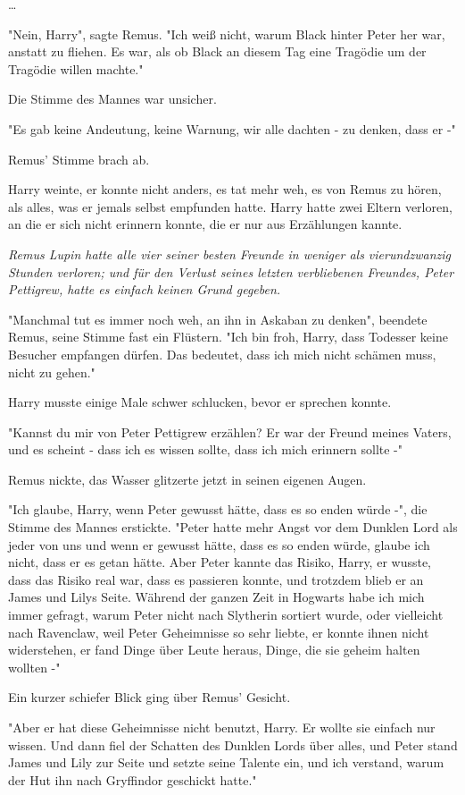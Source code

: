 {…

"Nein, Harry", sagte Remus. "Ich weiß nicht, warum Black hinter Peter her war, anstatt zu fliehen. Es war, als ob Black an diesem Tag eine Tragödie um der Tragödie willen machte."

Die Stimme des Mannes war unsicher.

"Es gab keine Andeutung, keine Warnung, wir alle dachten - zu denken, dass er -"

Remus' Stimme brach ab.

Harry weinte, er konnte nicht anders, es tat mehr weh, es von Remus zu hören, als alles, was er jemals selbst empfunden hatte. Harry hatte zwei Eltern verloren, an die er sich nicht erinnern konnte, die er nur aus Erzählungen kannte.

\emph{Remus Lupin hatte alle vier seiner besten Freunde in weniger als vierundzwanzig Stunden verloren; und für den Verlust seines letzten verbliebenen Freundes, Peter Pettigrew, hatte es einfach keinen Grund gegeben.}

"Manchmal tut es immer noch weh, an ihn in Askaban zu denken", beendete Remus, seine Stimme fast ein Flüstern. "Ich bin froh, Harry, dass Todesser keine Besucher empfangen dürfen. Das bedeutet, dass ich mich nicht schämen muss, nicht zu gehen."

Harry musste einige Male schwer schlucken, bevor er sprechen konnte.

"Kannst du mir von Peter Pettigrew erzählen? Er war der Freund meines Vaters, und es scheint - dass ich es wissen sollte, dass ich mich erinnern sollte -"

Remus nickte, das Wasser glitzerte jetzt in seinen eigenen Augen.

"Ich glaube, Harry, wenn Peter gewusst hätte, dass es so enden würde -", die Stimme des Mannes erstickte. "Peter hatte mehr Angst vor dem Dunklen Lord als jeder von uns und wenn er gewusst hätte, dass es so enden würde, glaube ich nicht, dass er es getan hätte. Aber Peter kannte das Risiko, Harry, er wusste, dass das Risiko real war, dass es passieren konnte, und trotzdem blieb er an James und Lilys Seite. Während der ganzen Zeit in Hogwarts habe ich mich immer gefragt, warum Peter nicht nach Slytherin sortiert wurde, oder vielleicht nach Ravenclaw, weil Peter Geheimnisse so sehr liebte, er konnte ihnen nicht widerstehen, er fand Dinge über Leute heraus, Dinge, die sie geheim halten wollten -"

Ein kurzer schiefer Blick ging über Remus' Gesicht.

"Aber er hat diese Geheimnisse nicht benutzt, Harry. Er wollte sie einfach nur wissen. Und dann fiel der Schatten des Dunklen Lords über alles, und Peter stand James und Lily zur Seite und setzte seine Talente ein, und ich verstand, warum der Hut ihn nach Gryffindor geschickt hatte."

}
